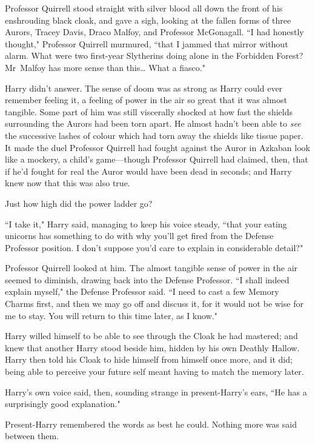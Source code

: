 Professor Quirrell stood straight with silver blood all down the front of his enshrouding black cloak, and gave a sigh, looking at the fallen forms of three Aurors, Tracey Davis, Draco Malfoy, and Professor McGonagall. ``I had honestly thought," Professor Quirrell murmured, ``that I jammed that mirror without alarm. What were two first-year Slytherins doing alone in the Forbidden Forest? Mr~Malfoy has more sense than this{\ldots} What a fiasco."

Harry didn't answer. The sense of doom was as strong as Harry could ever remember feeling it, a feeling of power in the air so great that it was almost tangible. Some part of him was still viscerally shocked at how fast the shields surrounding the Aurors had been torn apart. He almost hadn't been able to \emph{see} the successive lashes of colour which had torn away the shields like tissue paper. It made the duel Professor Quirrell had fought against the Auror in Azkaban look like a mockery, a child's game—though Professor Quirrell had claimed, then, that if he'd fought for real the Auror would have been dead in seconds; and Harry knew now that this was also true.

Just how high did the power ladder go?

``I take it," Harry said, managing to keep his voice steady, ``that your eating unicorns has something to do with why you'll get fired from the Defense Professor position. I don't suppose you'd care to explain in considerable detail?"

Professor Quirrell looked at him. The almost tangible sense of power in the air seemed to diminish, drawing back into the Defense Professor. ``I shall indeed explain myself," the Defense Professor said. ``I need to cast a few Memory Charms first, and then we may go off and discuss it, for it would not be wise for me to stay. You will return to this time later, as I know."

Harry willed himself to be able to see through the Cloak he had mastered; and knew that another Harry stood beside him, hidden by his own Deathly Hallow. Harry then told his Cloak to hide himself from himself once more, and it did; being able to perceive your future self meant having to match the memory later.

Harry's own voice said, then, sounding strange in present-Harry's ears, ``He has a surprisingly good explanation."

Present-Harry remembered the words as best he could. Nothing more was said between them.

